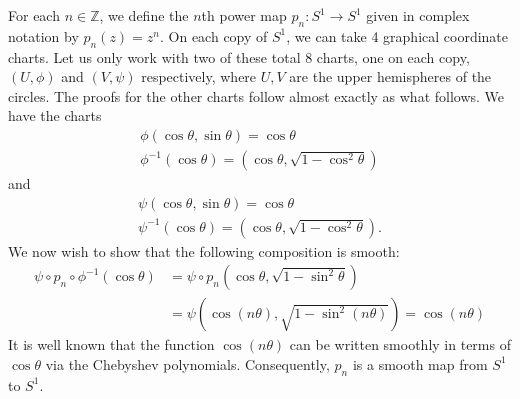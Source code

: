 \documentclass{../../mathnotes}
\begin{document}
For each $n\in\mathbb{Z}$, we define the $n$th power map $p_n:S^1\to S^1$ given in complex notation by $p_n(z)=z^n$.
On each copy of $S^1$, we can take 4 graphical coordinate charts. Let us only work with two of these total 8 charts, one on each copy,
$(U,\phi)$ and $(V,\psi)$ respectively, where $U,V$ are the upper hemispheres of the circles. The proofs for the other charts
follow almost exactly as what follows. We have the charts
\begin{align*}
    \phi(\cos\theta,\sin\theta)=\cos\theta\\
    \phi^{-1}(\cos\theta)=\left(\cos\theta,\sqrt{1-\cos^2\theta}\right)
\end{align*}
and
\begin{align*}
    \psi(\cos\theta,\sin\theta)=\cos\theta\\
    \psi^{-1}(\cos\theta)=\left(\cos\theta,\sqrt{1-\cos^2\theta}\right).
\end{align*}
We now wish to show that the following composition is smooth:
\begin{align*}
    \psi\circ p_n\circ\phi^{-1}(\cos\theta)&=\psi\circ p_n\left(\cos\theta,\sqrt{1-\sin^2\theta}\right)\\
    &=\psi\left(\cos(n\theta),\sqrt{1-\sin^2(n\theta)}\right)=\cos(n\theta)
\end{align*}
It is well known that the function $\cos(n\theta)$ can be written smoothly in terms of $\cos\theta$ via the Chebyshev
polynomials. Consequently, $p_n$ is a smooth map from $S^1$ to $S^1$.
\end{document}
